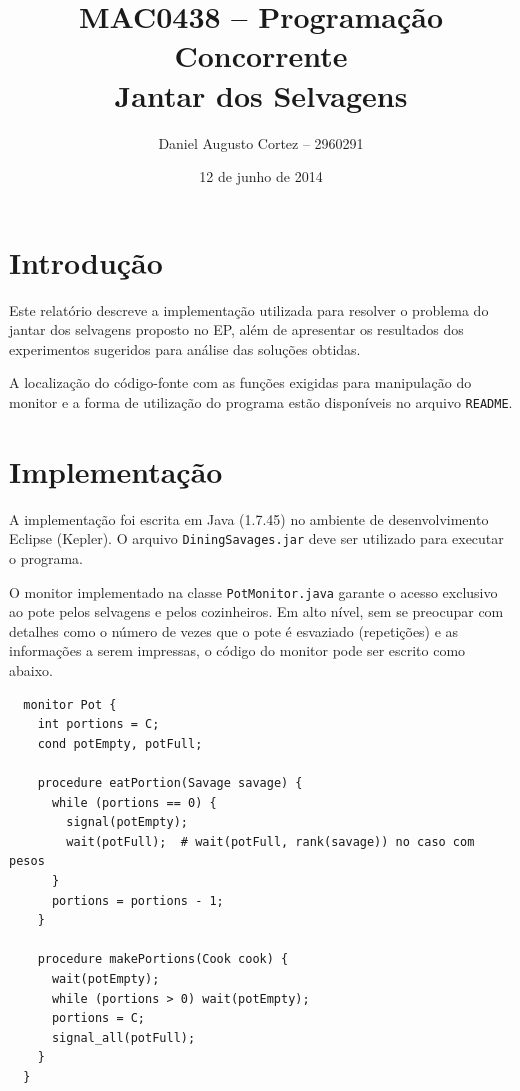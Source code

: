 \documentclass[11pt,a4paper]{article}
\newcommand{\zerar}{\setcounter{equation}{0}\setcounter{figure}{0}\setcounter{table}{0}}
\begin{document}
\title{
  {\sc MAC0438 -- Programação Concorrente} \\ 
  \vspace{0.5cm} 
  {\bf Jantar dos Selvagens}
}
\author{Daniel Augusto Cortez -- 2960291}
\date{12 de junho de 2014}

\maketitle


\zerar
\section{Introdução}
\label{sec:intro}

Este relatório descreve a implementação utilizada para resolver o problema do jantar dos selvagens
proposto no EP, além de apresentar os resultados dos experimentos sugeridos para análise das 
soluções obtidas.

A localização do código-fonte com as funções exigidas para manipulação do monitor e a forma de 
utilização do programa estão disponíveis no arquivo \verb|README|.


\zerar
\section{Implementação}
\label{sec:imp}

A implementação foi escrita em Java (1.7.45) no ambiente de desenvolvimento Eclipse (Kepler). O 
arquivo \verb|DiningSavages.jar| deve ser utilizado para executar o programa.

O monitor implementado na classe \verb|PotMonitor.java| garante o acesso exclusivo ao pote pelos
selvagens e pelos cozinheiros. Em alto nível, sem se preocupar com detalhes como o número de vezes 
que o pote é esvaziado (repetições) e as informações a serem impressas, o código do monitor pode ser 
escrito como abaixo.

\begin{verbatim}
  monitor Pot {
    int portions = C;
    cond potEmpty, potFull;

    procedure eatPortion(Savage savage) {
      while (portions == 0) {
        signal(potEmpty);
        wait(potFull);  # wait(potFull, rank(savage)) no caso com pesos
      }
      portions = portions - 1;
    }

    procedure makePortions(Cook cook) {
      wait(potEmpty);
      while (portions > 0) wait(potEmpty);
      portions = C;
      signal_all(potFull);
    }
  }
\end{verbatim}
\end{document}
